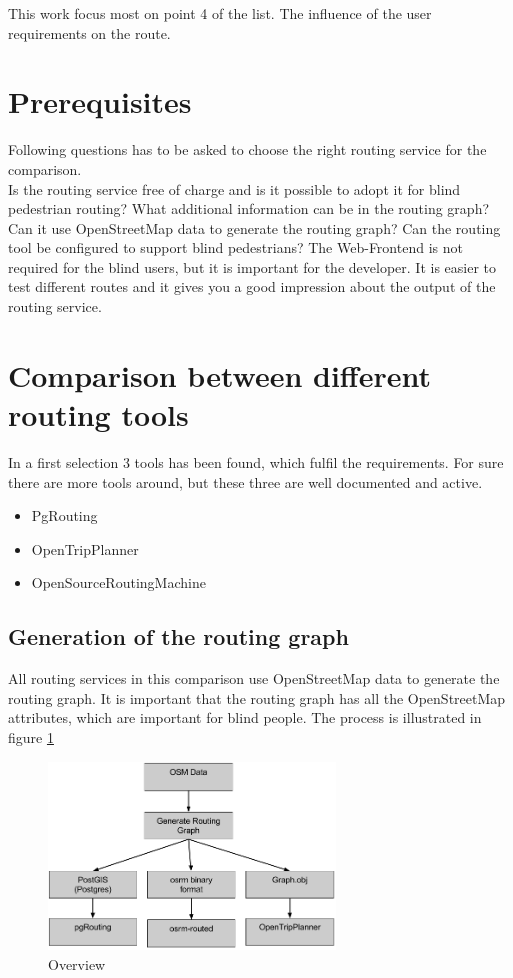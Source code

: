 \documentclass{sig-alternate}
\begin{document}
This work focus most on point 4 of the list. The influence of the user requirements on the route.  

\section{Prerequisites}
Following questions has to be asked to choose the right routing service for the comparison.\\
Is the routing service free of charge and is it possible to adopt it for blind pedestrian routing? What additional information can be in the routing graph? Can it use OpenStreetMap data to generate the routing graph? Can the routing tool be configured to support blind pedestrians? The Web-Frontend is not required for the blind users, but it is important for the developer. It is easier to test different routes and it gives you a good impression about the output of the routing service. 
\section{Comparison between different routing tools}
In a first selection 3 tools has been found, which fulfil the requirements. For sure there are more tools around, but these three are well documented and active.
\begin{itemize}
  \item PgRouting
  \item OpenTripPlanner
  \item OpenSourceRoutingMachine  
\end{itemize}

  
\subsection{Generation of the routing graph}

All routing services in this comparison use OpenStreetMap data to generate the routing graph. It is important that the routing graph has all the OpenStreetMap attributes, which are important for blind people. The process is illustrated in figure \ref{fig:overview}

\begin{figure}
\centering
\includegraphics[width=3in]{Overview2.png}
\caption{Overview}
\label{fig:overview}
\end{figure}
\end{document}
